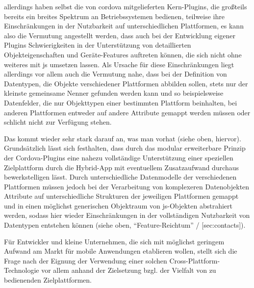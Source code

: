 allerdings haben selbst die von cordova mitgelieferten Kern-Plugins, die großteils bereits ein breites Spektrum an Betriebssystemen bedienen, teilweise ihre Einschränkungen in der Nutzbarkeit auf unterschiedlichen Plattformen, es kann also die Vermutung angestellt werden, dass auch bei der Entwicklung eigener Plugins Schwierigkeiten in der Unterstützung von detaillierten Objekteigenschaften und Geräte-Features auftreten können, die sich nicht ohne weiteres mit \gls{js} umsetzen lassen. 
Als Ursache für diese Einschränkungen liegt allerdings vor allem auch die Vermutung nahe, dass bei der Definition von Datentypen, die Objekte verschiedener Plattformen abbilden sollen, stets nur der kleinste gemeinsame Nenner gefunden werden kann und so beispielsweise Datenfelder, die nur Objekttypen einer bestimmten Plattform beinhalten, bei anderen Plattformen entweder auf andere Attribute gemappt werden müssen oder schlicht nicht zur Verfügung stehen. 


Das kommt wieder sehr stark darauf an, was man vorhat (siehe oben, hiervor).
Grundsätzlich lässt sich festhalten, dass durch das modular erweiterbare Prinzip der Cordova-Plugins eine nahezu vollständige Unterstützung einer speziellen Zielplattform durch die Hybrid-App mit eventuellem Zusatzaufwand durchaus bewerkstelligen lässt. 
Durch unterschiedliche Datenmodelle der verschiedenen Plattformen müssen jedoch bei der Verarbeitung von komplexeren Datenobjekten Attribute auf unterschiedliche Strukturen der jeweiligen Plattformen gemappt und in einen möglichst generischen Objektraum von \gls{js}-Objekten abstrahiert werden, sodass hier wieder Einschränkungen in der vollständigen Nutzbarkeit von Datentypen entstehen können (siehe oben, “Feature-Reichtum” / [sec:contacts]).


Für Entwickler und kleine Unternehmen, die sich mit möglichst geringem Aufwand am Markt für mobile Anwendungen etablieren wollen, stellt sich die Frage nach der Eignung der Verwendung einer solchen Cross-Plattform-Technologie vor allem anhand der Zielsetzung bzgl. der Vielfalt von zu bedienenden Zielplattformen.

